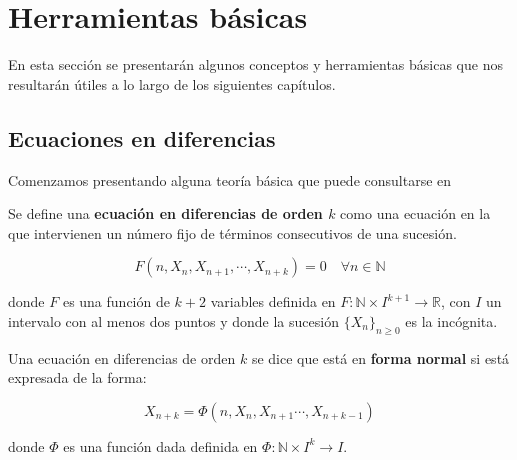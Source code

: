 
\chapter{Herramientas básicas}

En esta sección se presentarán algunos conceptos y herramientas básicas que nos resultarán útiles a lo largo de los siguientes capítulos.

\section{Ecuaciones en diferencias}

Comenzamos presentando alguna teoría básica que puede consultarse en \cite{salinelliDiscreteDynamicalModels2014}

\begin{definition}
Se define una \textbf{ecuación en diferencias de orden $k$} como una ecuación en la que intervienen un número fijo de términos consecutivos de una sucesión.

\begin{equation}
\label{def_ec_diferencias}
F(n,X_n, X_{n+1}, \cdots , X_{n+k}) = 0 \quad \forall n\in\mathbb{N}
\end{equation}


donde $F$ es una función de $k+2$ variables definida en $F:\mathbb{N}\times I^{k+1}\rightarrow \mathbb{R}$, con $I$ un intervalo con al menos dos puntos y donde la sucesión $\{X_n\}_{n\geq 0}$ es la incógnita.
\end{definition}

\begin{definition}
Una ecuación en diferencias de orden $k$ se dice que está en \textbf{forma normal} si está expresada de la forma:

\begin{equation}
\label{def_ec_forma_normal}
X_{n+k} = \Phi (n, X_n, X_{n+1}\cdots , X_{n+k-1})
\end{equation}


donde $\Phi$ es una función dada definida en $\Phi :\mathbb{N}\times I^{k}\rightarrow I$.
\end{definition}

